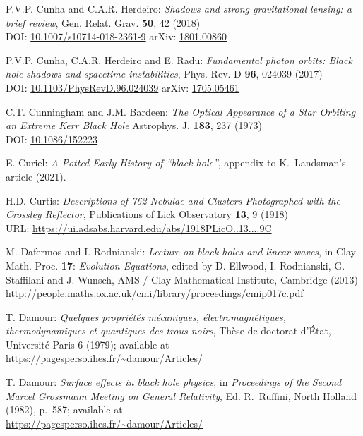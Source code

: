 \begin{thebibliography}{123}
P.V.P. Cunha and C.A.R. Herdeiro:
{\em Shadows and strong gravitational lensing: a brief review},
Gen. Relat. Grav. {\bf 50}, 42 (2018)\\
DOI: \href{https://doi.org/10.1007/s10714-018-2361-9}{10.1007/s10714-018-2361-9}\hfill
arXiv: \href{https://arxiv.org/abs/1801.00860}{1801.00860}

P.V.P. Cunha, C.A.R. Herdeiro and E. Radu:
{\em Fundamental photon orbits: Black hole shadows and spacetime instabilities},
Phys. Rev. D {\bf 96}, 024039 (2017)\\
DOI: \href{https://doi.org/10.1103/PhysRevD.96.024039}{10.1103/PhysRevD.96.024039}\hfill
arXiv: \href{https://arxiv.org/abs/1705.05461}{1705.05461}

C.T. Cunningham and J.M. Bardeen:
{\em The Optical Appearance of a Star Orbiting an Extreme Kerr Black Hole}
Astrophys. J. {\bf 183}, 237 (1973)\\
DOI: \href{https://doi.org/10.1086/152223}{10.1086/152223}

E. Curiel:
{\em A Potted Early History of ``black hole''},
appendix to K.~Landsman's article \cite{Lands21} (2021).

H.D. Curtis:
{\em Descriptions of 762 Nebulae and Clusters Photographed with the Crossley Reflector},
Publications of Lick Observatory {\bf 13}, 9 (1918)\\
URL: \url{https://ui.adsabs.harvard.edu/abs/1918PLicO..13....9C}

M. Dafermos and I. Rodnianski: {\em Lecture on black holes and linear waves},
in  Clay Math. Proc. {\bf 17}: {\em Evolution Equations}, edited by
D. Ellwood, I. Rodnianski, G. Staffilani and J. Wunsch, AMS / Clay Mathematical Institute,
Cambridge (2013) \\
\url{http://people.maths.ox.ac.uk/cmi/library/proceedings/cmip017c.pdf}

T. Damour: {\em Quelques propri\'et\'es m\'ecaniques, \'electromagn\'etiques,
thermo\-dy\-na\-mi\-ques et quantiques des trous noirs},
Th\`ese de doctorat d'\'Etat, Universit\'e Paris 6 (1979); available at\\
\url{https://pagesperso.ihes.fr/~damour/Articles/}

T. Damour: {\em Surface effects in black hole physics},
in {\em Proceedings of the Second Marcel Grossmann Meeting on General
Relativity}, Ed. R.~Ruffini, North Holland (1982), p.~587; available at\\
\url{https://pagesperso.ihes.fr/~damour/Articles/}


\end{thebibliography}
